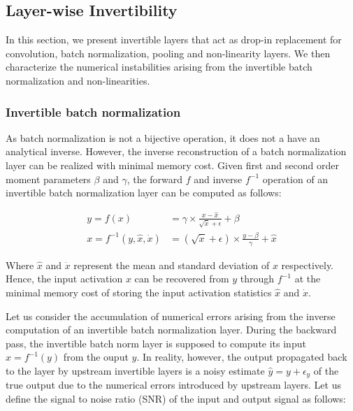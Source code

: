 \documentclass[twocolumn]{bmcart}
\begin{document}
\subsection{Layer-wise Invertibility}

In this section, we present invertible layers that act as drop-in replacement for convolution, batch normalization, pooling and non-linearity layers. We then characterize the numerical instabilities arising from the invertible batch normalization and non-linearities.

\subsubsection{Invertible batch normalization}

As batch normalization is not a bijective operation, it does not a have an analytical inverse.
However, the inverse reconstruction of a batch normalization layer can be realized with minimal memory cost.
Given first and second order moment parameters $\beta$ and $\gamma$, the forward $f$ and inverse $f^{-1}$ operation of an invertible batch normalization layer can be computed as follows:

\begin{subequations}
	\begin{align}
	y = f(x) &= \gamma \times \frac{x - \hat{x}}{\sqrt{\dot{x}} + \epsilon} + \beta \\
	x = f^{-1}(y, \hat{x}, \dot{x}) &= (\sqrt{\dot{x}} + \epsilon) \times \frac{y -  \beta}{\gamma}  + \hat{x}
	\end{align}
\end{subequations}

Where $\hat{x}$ and $\dot{x}$ represent the mean and standard deviation of $x$ respectively.
Hence, the input activation $x$ can be recovered from $y$ through $f^{-1}$ at the minimal memory cost of storing the input activation statistics $\hat{x}$ and $\dot{x}$.

Let us consider the accumulation of numerical errors arising from the inverse computation of an invertible batch normalization layer.
During the backward pass, the invertible batch norm layer is supposed to compute its input $x=f^{-1}(y)$ from the ouput $y$. 
In reality, however, the output propagated back to the layer by upstream invertible layers is a noisy estimate $\hat{y}=y+\epsilon_y$ of the true output due to the numerical errors introduced by upstream layers. 
Let us define the signal to noise ratio (SNR) of the input and output signal as follows:
\end{document}
